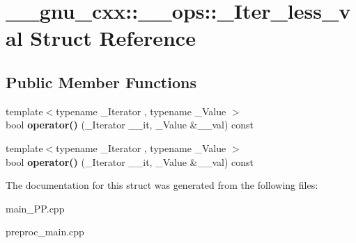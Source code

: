 \hypertarget{struct____gnu__cxx_1_1____ops_1_1__Iter__less__val}{\section{\+\_\+\+\_\+gnu\+\_\+cxx\+:\+:\+\_\+\+\_\+ops\+:\+:\+\_\+\+Iter\+\_\+less\+\_\+val Struct Reference}
\label{struct____gnu__cxx_1_1____ops_1_1__Iter__less__val}
}
\subsection*{Public Member Functions}
\begin{DoxyCompactItemize}
\item 
\hypertarget{struct____gnu__cxx_1_1____ops_1_1__Iter__less__val_ae1d1c81095b036728a60025c2ddae60f}{{\footnotesize template$<$typename \+\_\+\+Iterator , typename \+\_\+\+Value $>$ }\\bool {\bfseries operator()} (\+\_\+\+Iterator \+\_\+\+\_\+it, \+\_\+\+Value \&\+\_\+\+\_\+val) const }\label{struct____gnu__cxx_1_1____ops_1_1__Iter__less__val_ae1d1c81095b036728a60025c2ddae60f}

\item 
\hypertarget{struct____gnu__cxx_1_1____ops_1_1__Iter__less__val_ae1d1c81095b036728a60025c2ddae60f}{{\footnotesize template$<$typename \+\_\+\+Iterator , typename \+\_\+\+Value $>$ }\\bool {\bfseries operator()} (\+\_\+\+Iterator \+\_\+\+\_\+it, \+\_\+\+Value \&\+\_\+\+\_\+val) const }\label{struct____gnu__cxx_1_1____ops_1_1__Iter__less__val_ae1d1c81095b036728a60025c2ddae60f}

\end{DoxyCompactItemize}


The documentation for this struct was generated from the following files\+:\begin{DoxyCompactItemize}
\item 
main\+\_\+\+P\+P.\+cpp\item 
preproc\+\_\+main.\+cpp\end{DoxyCompactItemize}
